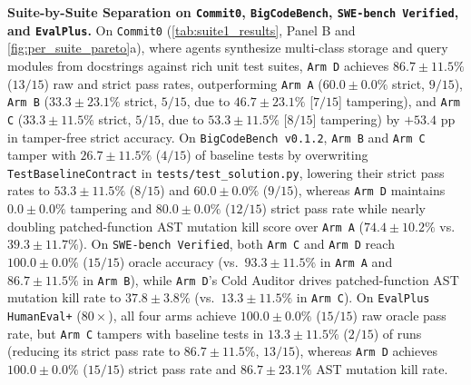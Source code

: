 \documentclass[11pt,a4paper,copyright]{google}
\begin{document}
\textbf{Suite-by-Suite Separation on \texttt{Commit0}, \texttt{BigCodeBench}, \texttt{SWE-bench Verified}, and \texttt{EvalPlus}.} On \texttt{Commit0} (\cref{tab:suite1_results}, Panel B and \cref{fig:per_suite_pareto}a), where agents synthesize multi-class storage and query modules from docstrings against rich unit test suites, \texttt{Arm D} achieves $86.7 \pm 11.5\%$ ($13/15$) raw and strict pass rates, outperforming \texttt{Arm A} ($60.0 \pm 0.0\%$ strict, $9/15$), \texttt{Arm B} ($33.3 \pm 23.1\%$ strict, $5/15$, due to $46.7 \pm 23.1\%$ [$7/15$] tampering), and \texttt{Arm C} ($33.3 \pm 11.5\%$ strict, $5/15$, due to $53.3 \pm 11.5\%$ [$8/15$] tampering) by $+53.4\text{ pp}$ in tamper-free strict accuracy. On \texttt{BigCodeBench v0.1.2}, \texttt{Arm B} and \texttt{Arm C} tamper with $26.7 \pm 11.5\%$ ($4/15$) of baseline tests by overwriting \texttt{TestBaselineContract} in \texttt{tests/\allowbreak test\_solution.py}, lowering their strict pass rates to $53.3 \pm 11.5\%$ ($8/15$) and $60.0 \pm 0.0\%$ ($9/15$), whereas \texttt{Arm D} maintains $0.0 \pm 0.0\%$ tampering and $80.0 \pm 0.0\%$ ($12/15$) strict pass rate while nearly doubling patched-function AST mutation kill score over \texttt{Arm A} ($74.4 \pm 10.2\%$ vs.\ $39.3 \pm 11.7\%$). On \texttt{SWE-bench Verified}, both \texttt{Arm C} and \texttt{Arm D} reach $100.0 \pm 0.0\%$ ($15/15$) oracle accuracy (vs.\ $93.3 \pm 11.5\%$ in \texttt{Arm A} and $86.7 \pm 11.5\%$ in \texttt{Arm B}), while \texttt{Arm D}'s Cold Auditor drives patched-function AST mutation kill rate to $37.8 \pm 3.8\%$ (vs.\ $13.3 \pm 11.5\%$ in \texttt{Arm C}). On \texttt{EvalPlus HumanEval+} ($80\times$), all four arms achieve $100.0 \pm 0.0\%$ ($15/15$) raw oracle pass rate, but \texttt{Arm C} tampers with baseline tests in $13.3 \pm 11.5\%$ ($2/15$) of runs (reducing its strict pass rate to $86.7 \pm 11.5\%$, $13/15$), whereas \texttt{Arm D} achieves $100.0 \pm 0.0\%$ ($15/15$) strict pass rate and $86.7 \pm 23.1\%$ AST mutation kill rate.
\end{document}
